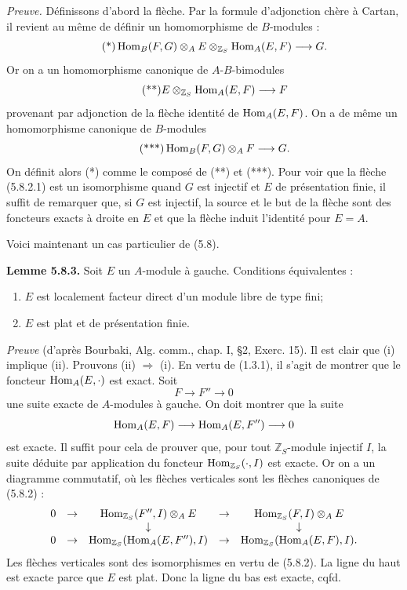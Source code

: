 \documentclass[11pt]{article}
\begin{document}
\emph{Preuve.} Définissons d'abord la flèche. Par la formule d'adjonction chère à Cartan, il revient au même de définir un homomorphisme de \(B\)-modules :
\begin{equation}\tag{*}
  \operatorname{Hom}_B(F,G)\otimes_A E\otimes_{\mathbb Z_S}\operatorname{Hom}_A(E,F)
  \longrightarrow G.
\end{equation}
Or on a un homomorphisme canonique de \(A\)-\(B\)-bimodules
\begin{equation}\tag{**}
  E\otimes_{\mathbb Z_S}\operatorname{Hom}_A(E,F)
  \longrightarrow F
\end{equation}
provenant par adjonction de la flèche identité de \(\operatorname{Hom}_A(E,F)\). On a de même un homomorphisme canonique de \(B\)-modules
\begin{equation}\tag{***}
  \operatorname{Hom}_B(F,G)\otimes_A F\longrightarrow G.
\end{equation}
On définit alors (*) comme le composé de (**) et (***). Pour voir que la flèche (5.8.2.1) est un isomorphisme quand \(G\) est injectif et \(E\) de présentation finie, il suffit de remarquer que, si \(G\) est injectif, la source et le but de la flèche sont des foncteurs exacts à droite en \(E\) et que la flèche induit l'identité pour \(E=A\).

Voici maintenant un cas particulier de (5.8).

\textbf{Lemme 5.8.3.} Soit \(E\) un \(A\)-module à gauche. Conditions équivalentes :
\begin{enumerate}[label=(\roman*)]
\item \(E\) est localement facteur direct d'un module libre de type fini;
\item \(E\) est plat et de présentation finie.
\end{enumerate}

\emph{Preuve} (d'après Bourbaki, Alg. comm., chap. I, §2, Exerc. 15). Il est clair que (i) implique (ii). Prouvons (ii) \(\Rightarrow\) (i). En vertu de (1.3.1), il s'agit de montrer que le foncteur \(\operatorname{Hom}_A(E,\cdot)\) est exact. Soit
\[
  F\longrightarrow F''\longrightarrow 0
\]
une suite exacte de \(A\)-modules à gauche. On doit montrer que la suite
\[
  \operatorname{Hom}_A(E,F)\longrightarrow \operatorname{Hom}_A(E,F'')\longrightarrow 0
\]
est exacte. Il suffit pour cela de prouver que, pour tout \(\mathbb Z_S\)-module injectif \(I\), la suite déduite par application du foncteur \(\operatorname{Hom}_{\mathbb Z_S}(\cdot,I)\) est exacte. Or on a un diagramme commutatif, où les flèches verticales sont les flèches canoniques de (5.8.2) :
\[
\begin{array}{ccccccccc}
0&\to&\operatorname{Hom}_{\mathbb Z_S}(F'',I)\otimes_A E&\to&\operatorname{Hom}_{\mathbb Z_S}(F,I)\otimes_A E\\
&&\downarrow&&\downarrow\\
0&\to&\operatorname{Hom}_{\mathbb Z_S}(\operatorname{Hom}_A(E,F''),I)&\to&\operatorname{Hom}_{\mathbb Z_S}(\operatorname{Hom}_A(E,F),I).
\end{array}
\]
Les flèches verticales sont des isomorphismes en vertu de (5.8.2). La ligne du haut est exacte parce que \(E\) est plat. Donc la ligne du bas est exacte, cqfd.
\end{document}

